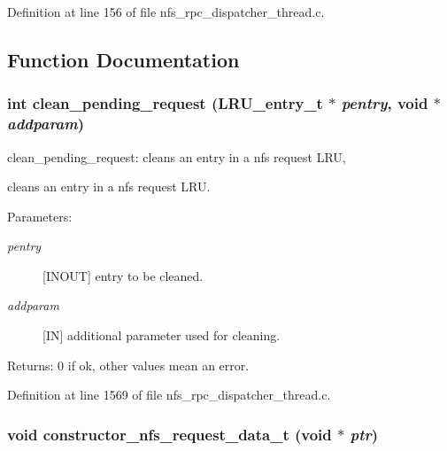 Definition at line 156 of file nfs\_\-rpc\_\-dispatcher\_\-thread.c.

\subsection{Function Documentation}
\subsubsection[{clean\_\-pending\_\-request}]{\setlength{\rightskip}{0pt plus 5cm}int clean\_\-pending\_\-request (LRU\_\-entry\_\-t $\ast$ {\em pentry}, \/  void $\ast$ {\em addparam})}\label{nfs__rpc__dispatcher__thread_8c_f8096617fe01cfa40ad63e5c15a43983}


clean\_\-pending\_\-request: cleans an entry in a nfs request LRU,

cleans an entry in a nfs request LRU.

\begin{Desc}
\item[Parameters:]
\begin{description}
\item[{\em pentry}][INOUT] entry to be cleaned. \item[{\em addparam}][IN] additional parameter used for cleaning.\end{description}
\end{Desc}
\begin{Desc}
\item[Returns:]0 if ok, other values mean an error. \end{Desc}


Definition at line 1569 of file nfs\_\-rpc\_\-dispatcher\_\-thread.c.
\subsubsection[{constructor\_\-nfs\_\-request\_\-data\_\-t}]{\setlength{\rightskip}{0pt plus 5cm}void constructor\_\-nfs\_\-request\_\-data\_\-t (void $\ast$ {\em ptr})}\label{nfs__rpc__dispatcher__thread_8c_fffa743dbd2aef77cdc7d24ec263005f}


